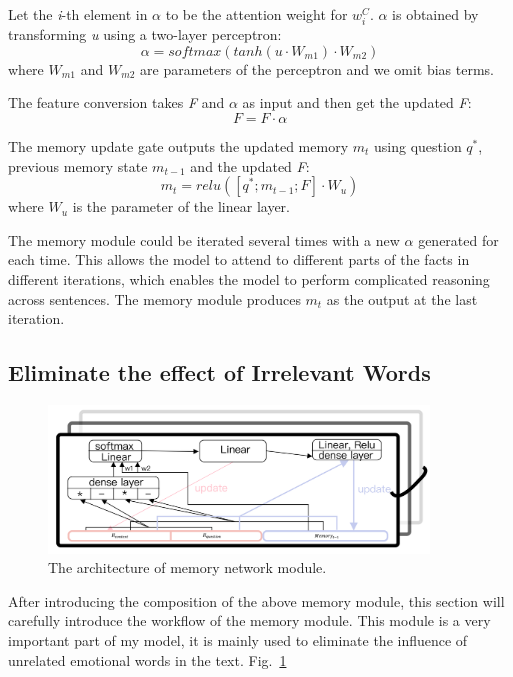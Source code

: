 \documentclass{ieeeaccess}
\begin{document}
Let the \emph{i}-th element in $\alpha$ to be the attention weight for $w_i^C$. $\alpha$ is obtained by transforming \emph{u} using a two-layer perceptron:
\begin{equation}\alpha = softmax\left(tanh\left(u\cdot W_{m1}\right)\cdot W_{m2}\right)\end{equation}
where $W_{m1}$ and $W_{m2}$ are parameters of the perceptron and we omit bias terms.

The feature conversion takes \emph{F} and $\alpha$ as input and then get the updated \emph{F}:
\begin{equation}F = F \cdot \alpha\label{con:updatecontext}\end{equation}

The memory update gate outputs the updated memory $m_t$ using question $q^{\ast}$, previous memory state $m_{t-1}$ and the updated \emph{F}: 
\begin{equation}m_t = relu\left(\left[q^\ast;m_{t-1};F\right]\cdot W_u\right)\label{con:updatememory}\end{equation}
where $W_u$ is the parameter of the linear layer.

The memory module could be iterated several times with a new $\alpha$ generated for each time. This allows the model to attend to different parts of the facts in different iterations, which enables the model to perform complicated reasoning across sentences. The memory module produces $m_t$ as the output at the last iteration.

\subsection{Eliminate the effect  of Irrelevant Words}

\begin{figure}[htb]
	\centering
	\includegraphics[width=0.9\textwidth]{memoryNetwork.png}
	\caption{The architecture of memory network module.}\label{memorynetwork}
\end{figure}

After introducing the composition of the above memory module, this section will carefully introduce the workflow of the memory module. This module is a very important part of my model, it is mainly used to eliminate the influence of unrelated emotional words in the text.
Fig.~\ref{memorynetwork}
\end{document}
